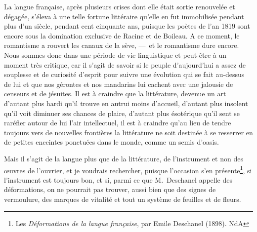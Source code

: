 \documentclass[french,twoside]{book} %
\begin{document}
La langue française, après plusieurs crises dont elle était sortie renouvelée et dégagée, s’éleva à une telle fortune littéraire qu’elle en fut immobilisée pendant plus d’un siècle, pendant cent cinquante ans, puisque les poètes de l’an 1819 sont encore sous la domination exclusive de Racine et de Boileau. A ce moment, le romantisme a rouvert les canaux de la sève, — et le romantisme dure encore. Nous sommes donc dans une période de vie linguistique et peut-être à un moment très critique, car il s’agit de savoir si le peuple d’aujourd’hui a assez de souplesse et de curiosité d’esprit pour suivre une évolution qui se fait au-dessus de lui et que nos gérontes et nos mandarins lui cachent avec une jalousie de censeurs et de jésuites. Il est à craindre que la littérature, devenue un art d’autant plus hardi qu’il trouve en autrui moins d’accueil, d’autant plus insolent qu’il voit diminuer ses chances de plaire, d’autant plus ésotérique qu’il sent se raréfier autour de lui l’air intellectuel, il est à craindre qu’au lieu de tendre toujours vers de nouvelles frontières la littérature ne soit destinée à se resserrer en de petites enceintes ponctuées dans le monde, comme un semis d’oasis.\par
Mais il s’agit de la langue plus que de la littérature, de l’instrument et non des œuvres de l’ouvrier, et je voudrais rechercher, puisque l’occasion s’en présente\footnote{ Les {\itshape Déformations de la langue française}, par Emile Deschanel (1898). NdA}, si l’instrument est toujours bon, et si, parmi ce que M. Deschanel appelle des déformations, on ne pourrait pas trouver, aussi bien que des signes de vermoulure, des marques de vitalité et tout un système de feuilles et de fleurs.\par
\end{document}
